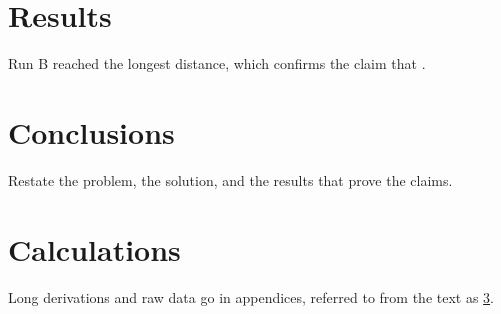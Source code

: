 \documentclass[a4paper, 11pt]{article}
\begin{document}
\section{Results}
\label{sec:results}
Run B reached the longest distance, which confirms the claim that .

\section{Conclusions}
\label{sec:conclusions}
Restate the problem, the solution, and the results that prove the claims.

\printbibliography[heading=bibintoc, title={References}]

\clearpage
\appendix
\section{Calculations}
\label{app:calculations}
Long derivations and raw data go in appendices, referred to from the text as
\cref{app:calculations}.
\end{document}
